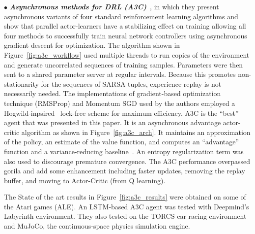 $\bullet$ \textit{\textbf{Asynchronous methods for DRL (A3C)}}~\parencite{mnih2016asynchronous}, in which they present asynchronous variants of four standard reinforcement learning algorithms and show that parallel actor-learners have a stabilizing effect on training allowing all four methods to successfully train neural network controllers using asynchronous gradient descent for optimization. The algorithm shown in Figure~\ref{fig:a3c_workflow} used multiple threads to run copies of the environment and generate uncorrelated sequences of training samples. Parameters were then sent to a shared parameter server at regular intervals. Because this promotes non-stationarity for the sequences of SARSA tuples, experience replay is not necessarily needed. The implementations of gradient-based optimization technique (RMSProp) and Momentum SGD used by the authors employed a Hogwild-inpsired~\parencite{recht2011hogwild} lock-free scheme for maximum efficiency. A3C is the ``best'' agent that was presented in this paper. It is an asynchronous advantage actor-critic algorithm as shown in Figure~\ref{fig:a3c_arch}. It maintains an approximation of the policy, an estimate of the value function, and computes an ``advantage'' function and a variance-reducing baseline~\parencite{degris2012off}. An entropy regularization term was also used to discourage premature convergence. The A3C performance overpassed gorila and add some enhancement including faster updates, removing  the replay buffer, and moving to Actor-Critic (from Q learning).

The State of the art results in Figure~\ref{fig:a3c_results} were obtained on some of the Atari games (ALE). An LSTM-based A3C agent was tested with Deepmind’s Labyrinth environment. They also tested on the TORCS car racing environment and MuJoCo, the continuous-space physics simulation engine.

